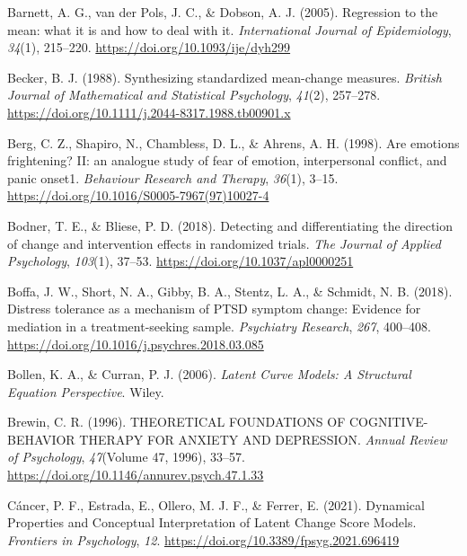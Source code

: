 \documentclass[
  man,floatsintext]{apa7}
\newlength{\cslhangindent}
\newlength{\cslentryspacingunit} %
\newenvironment{CSLReferences}[2] %
 {%
  \setlength{\parindent}{0pt}
  \ifodd #1
  \let\oldpar\par
  \def\par{\hangindent=\cslhangindent\oldpar}
  \fi
  \setlength{\parskip}{#2\cslentryspacingunit}
 }%
 {}
\begin{document}
\begin{CSLReferences}{1}{0}
\leavevmode{}%
Barnett, A. G., van der Pols, J. C., \& Dobson, A. J. (2005). Regression to the mean: what it is and how to deal with it. \emph{International Journal of Epidemiology}, \emph{34}(1), 215--220. \url{https://doi.org/10.1093/ije/dyh299}

\leavevmode{}%
Becker, B. J. (1988). Synthesizing standardized mean-change measures. \emph{British Journal of Mathematical and Statistical Psychology}, \emph{41}(2), 257--278. \url{https://doi.org/10.1111/j.2044-8317.1988.tb00901.x}

\leavevmode{}%
Berg, C. Z., Shapiro, N., Chambless, D. L., \& Ahrens, A. H. (1998). Are emotions frightening? II: an analogue study of fear of emotion, interpersonal conflict, and panic onset1. \emph{Behaviour Research and Therapy}, \emph{36}(1), 3--15. \url{https://doi.org/10.1016/S0005-7967(97)10027-4}

\leavevmode{}%
Bodner, T. E., \& Bliese, P. D. (2018). Detecting and differentiating the direction of change and intervention effects in randomized trials. \emph{The Journal of Applied Psychology}, \emph{103}(1), 37--53. \url{https://doi.org/10.1037/apl0000251}

\leavevmode{}%
Boffa, J. W., Short, N. A., Gibby, B. A., Stentz, L. A., \& Schmidt, N. B. (2018). Distress tolerance as a mechanism of PTSD symptom change: Evidence for mediation in a treatment-seeking sample. \emph{Psychiatry Research}, \emph{267}, 400--408. \url{https://doi.org/10.1016/j.psychres.2018.03.085}

\leavevmode{}%
Bollen, K. A., \& Curran, P. J. (2006). \emph{Latent Curve Models: A Structural Equation Perspective}. Wiley.

\leavevmode{}%
Brewin, C. R. (1996). THEORETICAL FOUNDATIONS OF COGNITIVE-BEHAVIOR THERAPY FOR ANXIETY AND DEPRESSION. \emph{Annual Review of Psychology}, \emph{47}(Volume 47, 1996), 33--57. \url{https://doi.org/10.1146/annurev.psych.47.1.33}

\leavevmode{}%
Cáncer, P. F., Estrada, E., Ollero, M. J. F., \& Ferrer, E. (2021). Dynamical Properties and Conceptual Interpretation of Latent Change Score Models. \emph{Frontiers in Psychology}, \emph{12}. \url{https://doi.org/10.3389/fpsyg.2021.696419}


\end{CSLReferences}
\end{document}
